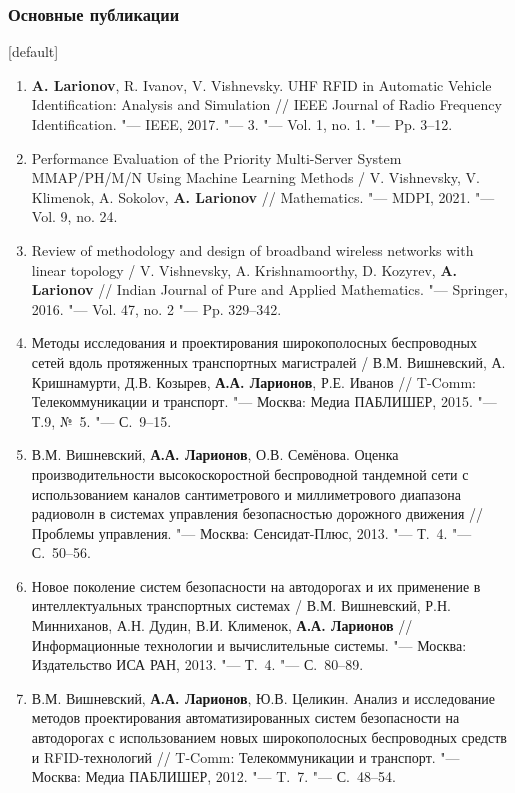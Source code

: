 \begin{frame} %
    \frametitle{Основные публикации}
    [default]
    \footnotesize
    \begin{enumerate}
        \item \textbf{A. Larionov}, R. Ivanov, V. Vishnevsky. UHF RFID in Automatic Vehicle Identification: Analysis and Simulation // IEEE Journal of Radio Frequency Identification. "--- IEEE, 2017. "--- 3. "--- Vol. 1, no. 1. "--- Pp. 3--12.
        \item Performance Evaluation of the Priority Multi-Server System MMAP/PH/M/N Using Machine Learning Methods / V. Vishnevsky, V. Klimenok, A. Sokolov, \textbf{A. Larionov} // Mathematics. "--- MDPI, 2021. "--- Vol. 9, no. 24.
        \item Review of methodology and design of broadband wireless networks with linear topology / V. Vishnevsky, A. Krishnamoorthy, D. Kozyrev, \textbf{A. Larionov} // Indian Journal of Pure and Applied Mathematics. "--- Springer, 2016. "--- Vol. 47, no. 2 "--- Pp. 329--342.
        \item Методы исследования и проектирования широкополосных беспроводных сетей вдоль протяженных транспортных магистралей / В.М. Вишневский, А. Кришнамурти, Д.В. Козырев, \textbf{А.А. Ларионов}, Р.Е. Иванов // T-Comm: Телекоммуникации и транспорт. "--- Москва: Медиа ПАБЛИШЕР, 2015. "--- Т.9, №~5. "--- С.~9--15.
        \item В.М. Вишневский, \textbf{А.А. Ларионов}, О.В. Семёнова. Оценка производительности высокоскоростной беспроводной тандемной сети с использованием каналов сантиметрового и миллиметрового диапазона радиоволн в системах управления безопасностью дорожного движения // Проблемы управления. "--- Москва: Сенсидат-Плюс, 2013. "--- Т.~4. "--- С.~50--56.
        \item Новое поколение систем безопасности на автодорогах и их применение в интеллектуальных транспортных системах / В.М. Вишневский, Р.Н. Минниханов, А.Н. Дудин, В.И. Клименок, \textbf{А.А. Ларионов} // Информационные технологии и вычислительные системы. "--- Москва: Издательство ИСА РАН, 2013. "--- Т.~4. "--- С.~80--89.
        \item В.М. Вишневский, \textbf{А.А. Ларионов}, Ю.В. Целикин. Анализ и исследование методов проектирования автоматизированных систем безопасности на автодорогах с использованием новых широкополосных беспроводных средств и RFID-технологий // T-Comm: Телекоммуникации и транспорт. "--- Москва: Медиа ПАБЛИШЕР, 2012. "--- T.~7. "--- С.~48--54.

\end{enumerate}
\end{frame}
